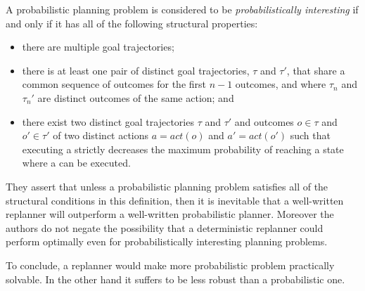 \begin{displayquote}
A probabilistic planning problem is considered to be \textit{probabilistically interesting} if and only if it has all of the following structural properties:
\begin{itemize}
\item there are multiple goal trajectories;
\item there is at least one pair of distinct goal trajectories, $\tau$
and $\tau'$, that share a common sequence of outcomes for the
first $n-1$ outcomes, and where $\tau_n$ and $\tau_n'$ are distinct
outcomes of the same action; and
\item there exist two distinct goal trajectories $\tau$ and $\tau'$ and outcomes $o \in \tau$ and $o' \in \tau'$ of two distinct actions $a = act(o)$ and $a' = act(o')$  such that executing a strictly decreases
the maximum probability of reaching a state where a can
be executed.
\end{itemize}
\end{displayquote}
They assert that unless a probabilistic planning problem satisfies all of the structural conditions in this definition, then
it is inevitable that a well-written replanner will outperform
a well-written probabilistic planner. Moreover the authors do not negate the possibility that a deterministic replanner could perform optimally even for probabilistically interesting planning problems. 

To conclude, a replanner would make more probabilistic problem practically solvable. In the other hand it suffers to be less robust than a probabilistic one. 


\begin{comment}
From their analysis the state that probabilist planning has some useful properties which a deterministic replanning does not have, and they are:
\begin{itemize}
\item The lack off \textit{dead end} states, from which the goal is unreachable through any
combination of chance and choice,
\item  the degree to which the probability of reaching a \textit{dead end} state can be reduced through the choice of actions,
\item a higher degree in the solution trajectory, yielding to possible several and feasible solutions,
\item  the presence of mutual exclusion
\end{itemize}
\end{comment}

